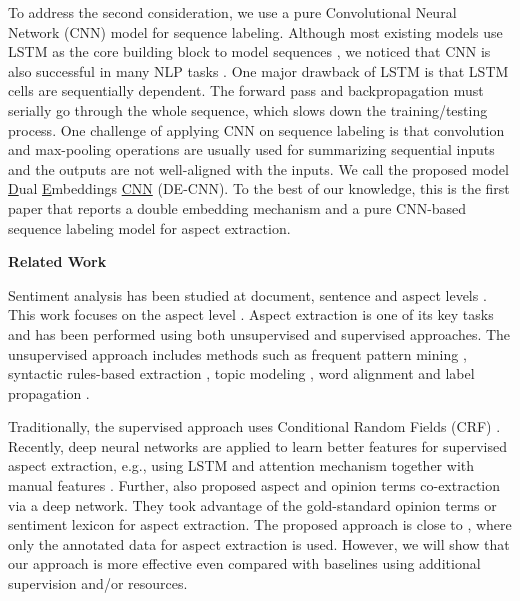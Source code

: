 To address the second consideration, we use a pure Convolutional Neural Network (CNN) \cite{lecun1995convolutional} model for sequence labeling.
Although most existing models use LSTM \cite{hochreiter1997long} as the core building block to model sequences \cite{liu2015fine,li2017deep}, we noticed that CNN is also successful in many NLP tasks \cite{kim2014convolutional,zhang2015character,gehring2017convolutional}.
One major drawback of LSTM is that LSTM cells are sequentially dependent.
The forward pass and backpropagation must serially go through the whole sequence, which slows down the training/testing process.
One challenge of applying CNN on sequence labeling is that convolution and max-pooling operations are usually used for summarizing sequential inputs and the outputs are not well-aligned with the inputs. %
We call the proposed model \underline{D}ual \underline{E}mbeddings \underline{CNN} (DE-CNN).
To the best of our knowledge, this is the first paper that reports a double embedding mechanism and a pure CNN-based sequence labeling model for aspect extraction.

\textbf{Related Work}

Sentiment analysis has been studied at document, sentence and aspect levels \cite{Liu2012,Pang2008OMS,Cambria2012}. This work focuses on the aspect level \cite{HuL2004}. Aspect extraction is one of its key tasks and has been performed using both unsupervised and supervised approaches. 
The unsupervised approach includes methods such as frequent pattern mining \cite{HuL2004,PopescuNE2005}, syntactic rules-based extraction \cite{ZhuangJZ2006,WangBo2008,QiuLBC2011}, topic modeling \cite{MeiLWSZ2007,TitovM2008,Lin2009,Moghaddam2011}, word alignment \cite{KangLiu2013IJCAI} and label propagation \cite{Zhou-wan-xiao:2013:EMNLP,shu2016lifelong}.

Traditionally, the supervised approach \cite{Jakob2010,Mitchell-EtAl:2013:EMNLP,shu2017lifelong} uses Conditional Random Fields (CRF) \cite{Lafferty2001conditional}.
Recently, deep neural networks are applied to learn better features for supervised aspect extraction, e.g., using
LSTM \cite{williams1989learning,hochreiter1997long,liu2015fine} and
attention mechanism \cite{wang2017coupled,he2017unsupervised} together with manual features \cite{poria2016aspect,wang2016recursive}.
Further, \cite{wang2016recursive,wang2017coupled,li2017deep} also proposed aspect and opinion terms co-extraction via a deep network.
They took advantage of the gold-standard opinion terms or sentiment lexicon for aspect extraction.
The proposed approach is close to \cite{liu2015fine}, where only the annotated data for aspect extraction is used. 
However, we will show that our approach is more effective even compared with baselines using additional supervision and/or resources.


